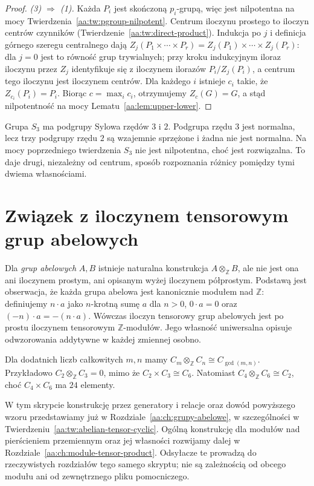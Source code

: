 \begin{proof}
\emph{(3) $\Rightarrow$ (1).}
Każda $P_i$ jest skończoną $p_i$-grupą,
więc jest nilpotentna na mocy
Twierdzenia~\ref{aa:tw:pgroup-nilpotent}.
Centrum iloczynu prostego to iloczyn centrów czynników
(Twierdzenie~\ref{aa:tw:direct-product}).
Indukcja po $j$ i definicja górnego szeregu centralnego
dają
$Z_j(P_1\times\cdots\times P_r)
=Z_j(P_1)\times\cdots\times Z_j(P_r)$:
dla $j=0$ jest to równość grup trywialnych;
przy kroku indukcyjnym iloraz iloczynu przez $Z_j$
identyfikuje się z iloczynem ilorazów $P_i/Z_j(P_i)$,
a centrum tego iloczynu jest iloczynem centrów.
Dla każdego $i$ istnieje $c_i$ takie, że $Z_{c_i}(P_i)=P_i$.
Biorąc $c=\max_i c_i$, otrzymujemy $Z_c(G)=G$,
a stąd nilpotentność na mocy
Lematu~\ref{aa:lem:upper-lower}.
\end{proof}

\begin{przyklad}
Grupa $S_3$ ma podgrupy Sylowa rzędów $3$ i $2$.
Podgrupa rzędu $3$ jest normalna, lecz trzy podgrupy
rzędu $2$ są wzajemnie sprzężone i żadna nie jest normalna.
Na mocy poprzedniego twierdzenia $S_3$ nie jest nilpotentna,
choć jest rozwiązalna. To daje drugi, niezależny od centrum,
sposób rozpoznania różnicy pomiędzy tymi dwiema własnościami.
\end{przyklad}

\section{Związek z iloczynem tensorowym grup abelowych}
\label{aa:sec:tensor-group-plan}
Dla \emph{grup abelowych} $A,B$ istnieje naturalna konstrukcja
$A\otimes_{\mathbb Z}B$, ale nie jest ona ani iloczynem prostym,
ani opisanym wyżej iloczynem półprostym.
Podstawą jest obserwacja, że każda grupa abelowa jest
kanonicznie modułem nad $\mathbb Z$: definiujemy
$n\cdot a$ jako $n$-krotną sumę $a$ dla $n>0$,
$0\cdot a=0$ oraz $(-n)\cdot a=-(n\cdot a)$.
Wówczas iloczyn tensorowy grup abelowych jest po prostu
iloczynem tensorowym $\mathbb Z$-modułów.
Jego własność uniwersalna opisuje odwzorowania
addytywne w każdej zmiennej osobno.

Dla dodatnich liczb całkowitych $m,n$ mamy
$C_m\otimes_{\mathbb Z}C_n\cong C_{\gcd(m,n)}$.
Przykładowo $C_2\otimes_{\mathbb Z}C_3=0$, mimo że
$C_2\times C_3\cong C_6$. Natomiast
$C_4\otimes_{\mathbb Z}C_6\cong C_2$, choć
$C_4\times C_6$ ma $24$ elementy.

W tym skrypcie konstrukcję przez generatory i relacje oraz
dowód powyższego wzoru przedstawiamy już w
Rozdziale~\ref{aa:ch:grupy-abelowe},
w szczególności w
Twierdzeniu~\ref{aa:tw:abelian-tensor-cyclic}.
Ogólną konstrukcję dla modułów nad pierścieniem przemiennym
oraz jej własności rozwijamy dalej w
Rozdziale~\ref{aa:ch:module-tensor-product}.
Odsyłacze te prowadzą do rzeczywistych rozdziałów tego
samego skryptu; nie są zależnością od obcego modułu ani
od zewnętrznego pliku pomocniczego.
